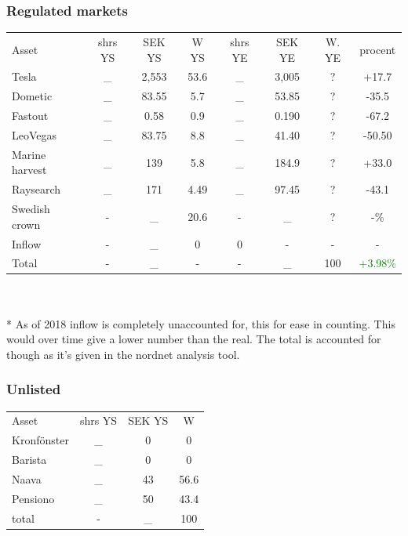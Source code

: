 \documentclass[a4paper]{article}
\begin{document}
	\subsubsection{Regulated markets}
	
	\begin{tabular}{l|c|c|c|c|c|c|c}
		Asset & shrs YS & SEK YS & W YS& shrs YE & SEK YE & W. YE & procent \\
		Tesla & \_ & 2,553 & 53.6 & \_ & 3,005 & ? & +17.7 \\
		Dometic & \_ & 83.55 & 5.7 & \_ & 53.85 & ? & -35.5 \\
		Fastout & \_ & 0.58 & 0.9 & \_ & 0.190 & ? & -67.2 \\
		LeoVegas & \_ & 83.75 & 8.8 & \_ & 41.40 & ? & -50.50 \\
		Marine harvest & \_ & 139 & 5.8 & \_ & 184.9 & ? & +33.0\\
		Raysearch & \_ & 171 & 4.49 & \_ & 97.45 & ? & -43.1\\
		
		Swedish crown & - & \_ & 20.6 & - & \_ & ? & -\% \\
		Inflow & - & \_ & 0 & 0 & - & - & - \\ 
		Total & - & \_ & - & - & \_ & 100 & \textcolor{green}{+3.98\%}
	\end{tabular} \\
	\\
	
	* As of 2018 inflow is completely unaccounted for, this for ease in counting. This would over time give a lower number than the real. The total is accounted for though as it's given in the nordnet analysis tool.
	
	\subsubsection{Unlisted}
	\begin{tabular}{l|c|c|c}
		Asset & shrs YS & SEK YS & W \\
		Kronfönster & \_ & 0 & 0 \\ 
		Barista & \_ & 0 & 0 \\
		Naava & \_ & 43 & 56.6 \\ %
		Pensiono & \_ & 50 & 43.4\\ %
		
		total & - & \_ & 100
	\end{tabular} \\
	\\
\end{document}
